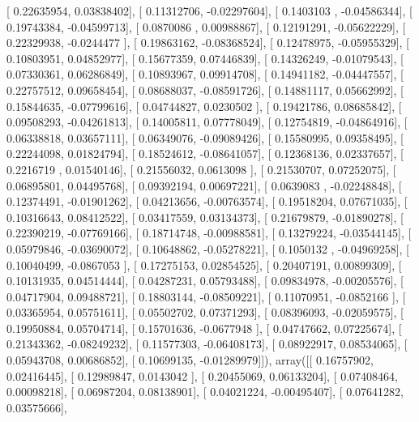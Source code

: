 \documentclass{article}
\begin{document}
       [ 0.22635954,  0.03838402],
       [ 0.11312706, -0.02297604],
       [ 0.1403103 , -0.04586344],
       [ 0.19743384, -0.04599713],
       [ 0.0870086 ,  0.00988867],
       [ 0.12191291, -0.05622229],
       [ 0.22329938, -0.0244477 ],
       [ 0.19863162, -0.08368524],
       [ 0.12478975, -0.05955329],
       [ 0.10803951,  0.04852977],
       [ 0.15677359,  0.07446839],
       [ 0.14326249, -0.01079543],
       [ 0.07330361,  0.06286849],
       [ 0.10893967,  0.09914708],
       [ 0.14941182, -0.04447557],
       [ 0.22757512,  0.09658454],
       [ 0.08688037, -0.08591726],
       [ 0.14881117,  0.05662992],
       [ 0.15844635, -0.07799616],
       [ 0.04744827,  0.0230502 ],
       [ 0.19421786,  0.08685842],
       [ 0.09508293, -0.04261813],
       [ 0.14005811,  0.07778049],
       [ 0.12754819, -0.04864916],
       [ 0.06338818,  0.03657111],
       [ 0.06349076, -0.09089426],
       [ 0.15580995,  0.09358495],
       [ 0.22244098,  0.01824794],
       [ 0.18524612, -0.08641057],
       [ 0.12368136,  0.02337657],
       [ 0.2216719 ,  0.01540146],
       [ 0.21556032,  0.0613098 ],
       [ 0.21530707,  0.07252075],
       [ 0.06895801,  0.04495768],
       [ 0.09392194,  0.00697221],
       [ 0.0639083 , -0.02248848],
       [ 0.12374491, -0.01901262],
       [ 0.04213656, -0.00763574],
       [ 0.19518204,  0.07671035],
       [ 0.10316643,  0.08412522],
       [ 0.03417559,  0.03134373],
       [ 0.21679879, -0.01890278],
       [ 0.22390219, -0.07769166],
       [ 0.18714748, -0.00988581],
       [ 0.13279224, -0.03544145],
       [ 0.05979846, -0.03690072],
       [ 0.10648862, -0.05278221],
       [ 0.1050132 , -0.04969258],
       [ 0.10040499, -0.0867053 ],
       [ 0.17275153,  0.02854525],
       [ 0.20407191,  0.00899309],
       [ 0.10131935,  0.04514444],
       [ 0.04287231,  0.05793488],
       [ 0.09834978, -0.00205576],
       [ 0.04717904,  0.09488721],
       [ 0.18803144, -0.08509221],
       [ 0.11070951, -0.0852166 ],
       [ 0.03365954,  0.05751611],
       [ 0.05502702,  0.07371293],
       [ 0.08396093, -0.02059575],
       [ 0.19950884,  0.05704714],
       [ 0.15701636, -0.0677948 ],
       [ 0.04747662,  0.07225674],
       [ 0.21343362, -0.08249232],
       [ 0.11577303, -0.06408173],
       [ 0.08922917,  0.08534065],
       [ 0.05943708,  0.00686852],
       [ 0.10699135, -0.01289979]]), array([[ 0.16757902,  0.02416445],
       [ 0.12989847,  0.0143042 ],
       [ 0.20455069,  0.06133204],
       [ 0.07408464,  0.00098218],
       [ 0.06987204,  0.08138901],
       [ 0.04021224, -0.00495407],
       [ 0.07641282,  0.03575666],
\end{document}
